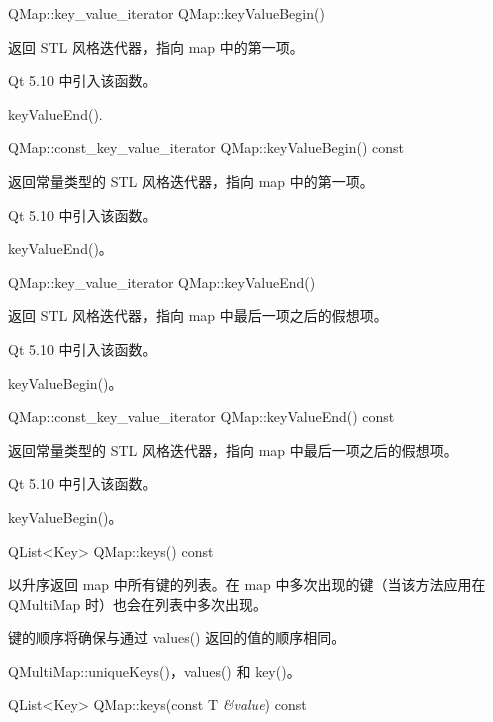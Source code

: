\splitLine

QMap::key\_value\_iterator QMap::keyValueBegin()

返回 STL 风格迭代器，指向 map 中的第一项。

Qt 5.10 中引入该函数。

\begin{notice}[另请参阅]
keyValueEnd().
\end{notice}

\splitLine

QMap::const\_key\_value\_iterator QMap::keyValueBegin() const

返回常量类型的 STL 风格迭代器，指向 map 中的第一项。

Qt 5.10 中引入该函数。

\begin{notice}[另请参阅]
keyValueEnd()。
\end{notice}

\splitLine

QMap::key\_value\_iterator QMap::keyValueEnd()

返回 STL 风格迭代器，指向 map 中最后一项之后的假想项。

Qt 5.10 中引入该函数。

\begin{notice}[另请参阅]
keyValueBegin()。
\end{notice}

\splitLine

QMap::const\_key\_value\_iterator QMap::keyValueEnd() const

返回常量类型的 STL 风格迭代器，指向 map 中最后一项之后的假想项。

Qt 5.10 中引入该函数。

\begin{notice}[另请参阅]
keyValueBegin()。
\end{notice}

\splitLine

QList<Key> QMap::keys() const

以升序返回 map 中所有键的列表。在 map 中多次出现的键（当该方法应用在 QMultiMap 时）也会在列表中多次出现。

键的顺序将确保与通过 values() 返回的值的顺序相同。

\begin{notice}[另请参阅]
QMultiMap::uniqueKeys()，values() 和 key()。
\end{notice}

\splitLine

QList<Key> QMap::keys(const T \emph{\&value}) const

